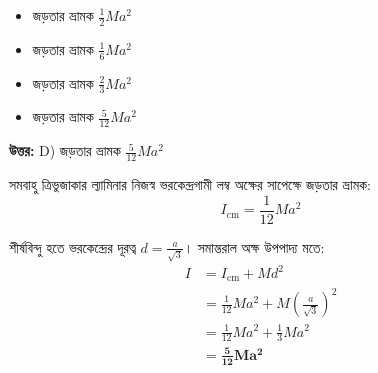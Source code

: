 \documentclass[12pt, a4paper]{article}
\begin{document}
{{%
\vspace{1em}
\begin{center}
\end{center}
\vspace{1em}

\begin{itemize}[label={}, leftmargin=1cm, itemsep=0.5em]
    \item[\textbf{A)}] জড়তার ভ্রামক $\frac{1}{2} M a^2$
    \item[\textbf{B)}] জড়তার ভ্রামক $\frac{1}{6} M a^2$
    \item[\textbf{C)}] জড়তার ভ্রামক $\frac{2}{3} M a^2$
    \item[\textbf{D)}] জড়তার ভ্রামক $\frac{5}{12} M a^2$
\end{itemize}

\vspace{0.5em}
\begin{tcolorbox}[answerbox]
    \textbf{\color{success} উত্তর:} D) জড়তার ভ্রামক $\frac{5}{12} M a^2$
\end{tcolorbox}
\vspace{1em}

\begin{tcolorbox}[solutionbox={সমাধান (Solution)}]
    \noindent
    সমবাহু ত্রিভুজাকার ল্যামিনার নিজস্ব ভরকেন্দ্রগামী লম্ব অক্ষের সাপেক্ষে জড়তার ভ্রামক:
    \[ I_{\text{cm}} = \frac{1}{12} M a^2 \]
    
    শীর্ষবিন্দু হতে ভরকেন্দ্রের দূরত্ব $d = \frac{a}{\sqrt{3}}$। সমান্তরাল অক্ষ উপপাদ্য মতে:
    \begin{align*}
        I &= I_{\text{cm}} + M d^2 \\
          &= \frac{1}{12} M a^2 + M \left(\frac{a}{\sqrt{3}}\right)^2 \\
          &= \frac{1}{12} M a^2 + \frac{1}{3} M a^2 \\
          &= \mathbf{\frac{5}{12} M a^2}
    \end{align*}
\end{tcolorbox}

}}
\end{document}
